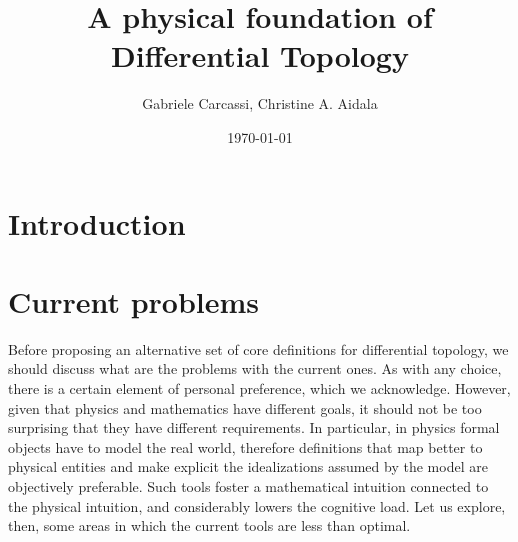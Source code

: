 \documentclass[10pt,twocolumn, nofootinbib]{revtex4-2}
\begin{document}
\title{A physical foundation of Differential Topology}
\author{Gabriele Carcassi, Christine A. Aidala}

\date{\today}


\begin{abstract}

\end{abstract}

\maketitle

\section{Introduction}

\section{Current problems}

Before proposing an alternative set of core definitions for differential topology, we should discuss what are the problems with the current ones. As with any choice, there is a certain element of personal preference, which we acknowledge. However, given that physics and mathematics have different goals, it should not be too surprising that they have different requirements. In particular, in physics formal objects have to model the real world, therefore definitions that map better to physical entities and make explicit the idealizations assumed by the model are objectively preferable. Such tools foster a mathematical intuition connected to the physical intuition, and considerably lowers the cognitive load. Let us explore, then, some areas in which the current tools are less than optimal.
\end{document}
